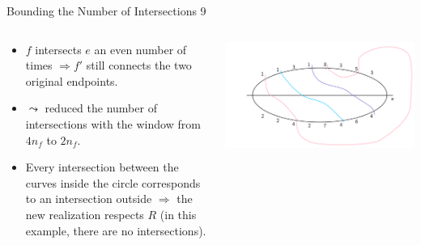 \documentclass[10pt,aspectratio=169]{beamer}
\theoremstyle{plain}
\begin{document}
\begin{frame}{Bounding the Number of Intersections 9}
    \begin{columns}
    \begin{column}{0.35\textwidth}
        \begin{itemize}
            \item \(f\) intersects \(e\) an even number of times \(\Rightarrow f'\) still connects the two original endpoints.
            \item<2-> \(\leadsto\) reduced the number of intersections with the window from \(4 n_f\) to \(2 n_f\).
            \item<3-> Every intersection between the curves inside the circle corresponds to an intersection outside \(\Rightarrow\) the new realization respects \(R\) (in this example, there are no intersections).
        \end{itemize}
    \end{column}
    \begin{column}{0.65\textwidth}
        \begin{center}
            \includegraphics[width=\textwidth]{images/figure-9.pdf}
        \end{center}
    \end{column}
    \end{columns}
\end{frame}
\end{document}
